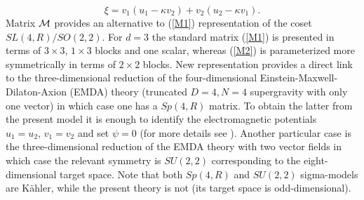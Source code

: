 \documentclass[a4paper,12pt]{article}
\begin{document}
\begin{equation}
\xi = v_1 \left( u_1 - \kappa v_2 \right) + v_2 \left( u_2 -
\kappa v_1 \right).
\end{equation}
Matrix ${\cal M}$ provides an alternative to (\ref{M1})
representation of the coset $SL(4,R)/SO(2,2)$. For $d=3$ the
standard matrix (\ref{M1}) is presented in terms of $3\times 3$,
$1\times 3$ blocks and one scalar, whereas (\ref{M2}) is
parameterized more symmetrically in terms of $2\times 2$ blocks.
New representation provides a direct link to the
three-dimensional reduction of the four-dimensional
Einstein-Maxwell-Dilaton-Axion (EMDA) theory \cite{GaKe96}
(truncated $D=4, N=4$ supergravity with only one vector) in which
case one has a $Sp(4,R)$ matrix. To obtain the latter from the
present model it is enough to identify the electromagnetic
potentials $u_1=u_2,\, v_1=v_2$ and set $\psi=0$ (for more
details see \cite{ClGa01}). Another particular case is the
three-dimensional reduction of the EMDA theory with two vector
fields in which case the relevant symmetry is $SU(2,2)$
\cite{GaSh97} corresponding to the eight-dimensional target
space. Note that both $Sp(4,R)$ and $SU(2,2)$ sigma-models are
K\"ahler, while the present theory is not (its target space is
odd-dimensional).
\end{document}

